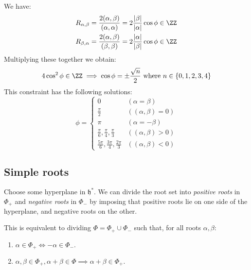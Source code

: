 \documentclass{jknotes}
\begin{document}
We have:
\begin{align}
    R_{\alpha,\beta} = \frac{2(\alpha,\beta)}{(\alpha,\alpha)} = 2\frac{|\beta|}{|\alpha|}\cos\phi\in\ZZ \\
    R_{\beta,\alpha} = \frac{2(\alpha,\beta)}{(\beta,\beta)} = 2\frac{|\alpha|}{|\beta|}\cos\phi\in\ZZ \\
\end{align}
Multiplying these together we obtain:
\begin{equation}
    4 \cos^2\phi \in \ZZ \implies \cos\phi = \pm\frac{\sqrt{n}}{2} \text{ where } n \in \{0,1,2,3,4\}
\end{equation}
This constraint has the following solutions:
\begin{equation}
    \phi = 
    \begin{cases}
        0 & (\alpha=\beta) \\
        \frac{\pi}{2} & ((\alpha,\beta) = 0) \\
        \pi & (\alpha = -\beta) \\
        \frac{\pi}{6},\frac{\pi}{4},\frac{\pi}{3} & ((\alpha,\beta) > 0) \\
        \frac{5\pi}{6},\frac{3\pi}{4},\frac{2\pi}{3} & ((\alpha,\beta) < 0)
    \end{cases}
\end{equation}

\subsection{Simple roots}
\begin{defn}
    Choose some hyperplane in \(\mathfrak{h}^*\). We can divide the root set into \emph{positive roots} in \(\Phi_+\) and \emph{negative roots} in \(\Phi_-\) by imposing that positive roots lie on one side of the hyperplane, and negative roots on the other.
    \begin{figure}[H]
        \centering
        \label{fig:hyperplane}
    \end{figure}
\end{defn}
This is equivalent to dividing \(\Phi = \Phi_+ \cup \Phi_-\) such that, for all roots \(\alpha,\beta\):
\begin{enumerate}[label=(\roman*)]
    \item \(\alpha \in \Phi_+ \iff -\alpha \in \Phi_-\).
    \item \(\alpha,\beta \in \Phi_+, \alpha+\beta \in \Phi \implies \alpha+\beta \in \Phi_+\).
\end{enumerate}
\end{document}
